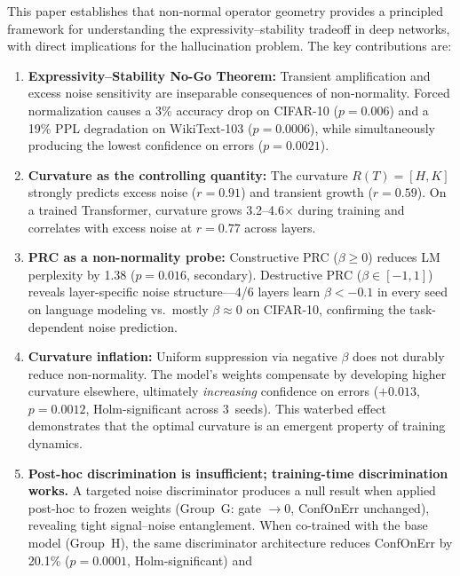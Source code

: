 \documentclass[11pt,a4paper]{article}
\theoremstyle{definition}
\begin{document}
This paper establishes that non-normal operator geometry provides a
principled framework for understanding the expressivity--stability
tradeoff in deep networks, with direct implications for the
hallucination problem. The key contributions are:

\begin{enumerate}[nosep]
  \item \textbf{Expressivity--Stability No-Go Theorem:} Transient
        amplification and excess noise sensitivity are inseparable
        consequences of non-normality. Forced normalization causes
        a 3\% accuracy drop on CIFAR-10 ($p = 0.006$) and a 19\%
        PPL degradation on WikiText-103 ($p = 0.0006$), while
        simultaneously producing the lowest confidence on errors
        ($p = 0.0021$).
  \item \textbf{Curvature as the controlling quantity:} The curvature
        $R(T) = [H,K]$ strongly predicts excess noise ($r = 0.91$)
        and transient growth ($r = 0.59$). On a trained Transformer,
        curvature grows 3.2--4.6$\times$ during training and
        correlates with excess noise at $r = 0.77$ across layers.
  \item \textbf{PRC as a non-normality probe:} Constructive PRC
        ($\beta \geq 0$) reduces LM perplexity by 1.38
        ($p = 0.016$, secondary). Destructive PRC
        ($\beta \in [-1,1]$) reveals layer-specific noise
        structure---4/6 layers learn $\beta < -0.1$ in every seed
        on language modeling vs.\ mostly $\beta \approx 0$ on
        CIFAR-10, confirming the task-dependent noise prediction.
  \item \textbf{Curvature inflation:} Uniform suppression via
        negative $\beta$ does not durably reduce non-normality.
        The model's weights compensate by developing higher
        curvature elsewhere, ultimately \emph{increasing}
        confidence on errors ($+0.013$, $p = 0.0012$,
        Holm-significant across 3~seeds). This waterbed effect
        demonstrates that the optimal curvature is an emergent
        property of training dynamics.
  \item \textbf{Post-hoc discrimination is insufficient; training-time
        discrimination works.} A targeted noise discriminator produces
        a null result when applied post-hoc to frozen weights
        (Group~G: gate $\to 0$, ConfOnErr unchanged), revealing tight
        signal--noise entanglement. When co-trained with the base
        model (Group~H), the same discriminator architecture reduces
        ConfOnErr by 20.1\% ($p = 0.0001$, Holm-significant) and

\end{enumerate}
\end{document}
